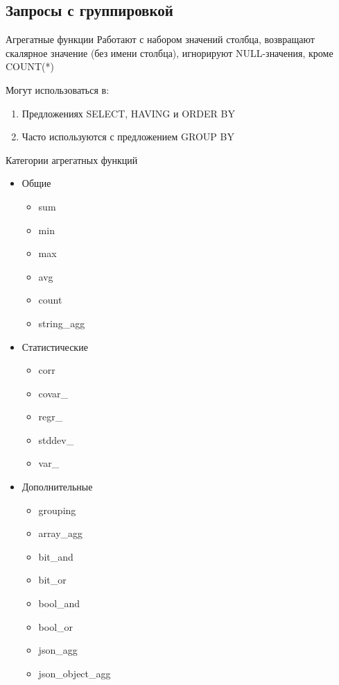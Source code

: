 \documentclass[12pt]{article}
\begin{document}
\subsection{Запросы с группировкой}

\begin{defin}{Агрегатные функции}
    Работают с набором значений столбца, возвращают скалярное значение (без имени столбца), игнорируют NULL-значения, кроме COUNT(*)

    Могут использоваться в:

    \begin{enumerate}
        \item Предложениях SELECT, HAVING и ORDER BY
        \item Часто используются с предложением GROUP BY
    \end{enumerate}
\end{defin}

\begin{nota}{Категории агрегатных функций}
    \begin{itemize}
        \item Общие 
        
        \begin{itemize}
            \item sum 
            \item min 
            \item max 
            \item avg 
            \item count 
            \item string\_agg
        \end{itemize}

        \item Статистические 
        
        \begin{itemize}
            \item corr 
            \item covar\_ 
            \item regr\_ 
            \item stddev\_ 
            \item var\_ 
        \end{itemize}

        \item Дополнительные 
        
        \begin{itemize}
            \item grouping
            \item array\_agg
            \item bit\_and 
            \item bit\_or
            \item bool\_and
            \item bool\_or
            \item json\_agg
            \item json\_object\_agg
        \end{itemize}
    \end{itemize}
\end{nota}
\end{document}
